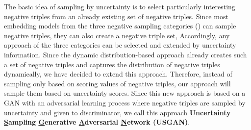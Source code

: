 The basic idea of sampling by uncertainty is to select particularly interesting negative triples from an already existing set of negative triples.
Since most embedding models from the three negative sampling categories () can sample negative triples, they can also create a negative triple set,
Accordingly, any approach of the three categories can be selected and extended by uncertainty information.
Since the dynamic distribution-based approach \kbgan already creates such a set of negative triples and captures the distribution of negative triples dynamically, we have decided to extend this approach.
Therefore, instead of sampling only based on scoring values of negative triples, our approach will sample them based on uncertainty scores.
Since this new approach is based on a \ac{GAN} with an adversarial learning process where negative triples are sampled by uncertainty and given to discriminator, we call this approach \textbf{\underline{U}ncertainty \underline{S}ampling \underline{G}enerative \underline{A}dversarial \underline{N}etwork (\textsc{USGAN})}.
